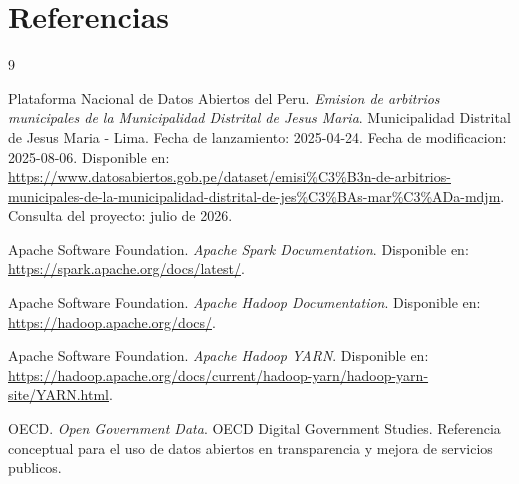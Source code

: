 \section{Referencias}

\begin{thebibliography}{9}

Plataforma Nacional de Datos Abiertos del Peru.
\textit{Emision de arbitrios municipales de la Municipalidad Distrital de Jesus Maria}.
Municipalidad Distrital de Jesus Maria - Lima. Fecha de lanzamiento: 2025-04-24. Fecha de modificacion: 2025-08-06. Disponible en: \url{https://www.datosabiertos.gob.pe/dataset/emisi%C3%B3n-de-arbitrios-municipales-de-la-municipalidad-distrital-de-jes%C3%BAs-mar%C3%ADa-mdjm}. Consulta del proyecto: julio de 2026.

Apache Software Foundation.
\textit{Apache Spark Documentation}.
Disponible en: \url{https://spark.apache.org/docs/latest/}.

Apache Software Foundation.
\textit{Apache Hadoop Documentation}.
Disponible en: \url{https://hadoop.apache.org/docs/}.

Apache Software Foundation.
\textit{Apache Hadoop YARN}.
Disponible en: \url{https://hadoop.apache.org/docs/current/hadoop-yarn/hadoop-yarn-site/YARN.html}.

OECD.
\textit{Open Government Data}. OECD Digital Government Studies.
Referencia conceptual para el uso de datos abiertos en transparencia y mejora de servicios publicos.

\end{thebibliography}
